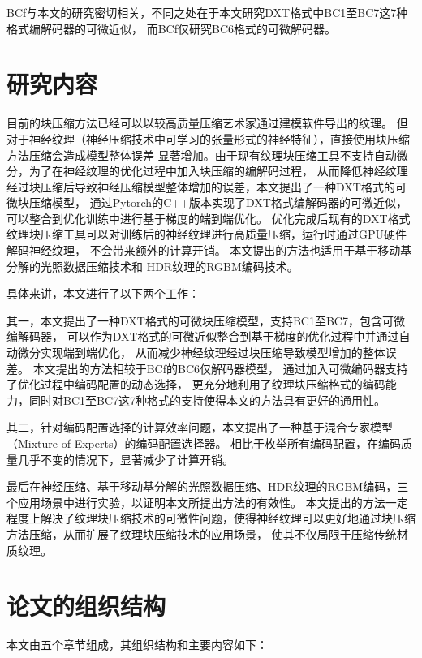 BCf\cite{weinreich2024real}与本文的研究密切相关，不同之处在于本文研究DXT格式中BC1至BC7这7种格式编解码器的可微近似，
而BCf\cite{weinreich2024real}仅研究BC6格式的可微解码器。

\section{研究内容}

目前的块压缩方法已经可以以较高质量压缩艺术家通过建模软件导出的纹理。
但对于神经纹理（神经压缩技术中可学习的张量形式的神经特征），直接使用块压缩方法压缩会造成模型整体误差
显著增加。由于现有纹理块压缩工具不支持自动微分，为了在神经纹理的优化过程中加入块压缩的编解码过程，
从而降低神经纹理经过块压缩后导致神经压缩模型整体增加的误差，本文提出了一种DXT格式的可微块压缩模型，
通过Pytorch的C++版本实现了DXT格式编解码器的可微近似，可以整合到优化训练中进行基于梯度的端到端优化。
优化完成后现有的DXT格式纹理块压缩工具可以对训练后的神经纹理进行高质量压缩，运行时通过GPU硬件解码神经纹理，
不会带来额外的计算开销。
本文提出的方法也适用于基于移动基分解的光照数据压缩技术\cite{silvennoinen2021moving}和
HDR纹理的RGBM编码技术。

具体来讲，本文进行了以下两个工作：

其一，本文提出了一种DXT格式的可微块压缩模型，支持BC1至BC7，包含可微编解码器，
可以作为DXT格式的可微近似整合到基于梯度的优化过程中并通过自动微分实现端到端优化，
从而减少神经纹理经过块压缩导致模型增加的整体误差。
本文提出的方法相较于BCf\cite{weinreich2024real}的BC6仅解码器模型，
通过加入可微编码器支持了优化过程中编码配置的动态选择，
更充分地利用了纹理块压缩格式的编码能力，同时对BC1至BC7这7种格式的支持使得本文的方法具有更好的通用性。

其二，针对编码配置选择的计算效率问题，本文提出了一种基于混合专家模型（Mixture of Experts）的编码配置选择器。
相比于枚举所有编码配置，在编码质量几乎不变的情况下，显著减少了计算开销。

最后在神经压缩\cite{weinreich2024real}、基于移动基分解的光照数据压缩\cite{silvennoinen2021moving}、HDR纹理的RGBM编码，三个应用场景中进行实验，以证明本文所提出方法的有效性。
本文提出的方法一定程度上解决了纹理块压缩技术的可微性问题，使得神经纹理可以更好地通过块压缩方法压缩，从而扩展了纹理块压缩技术的应用场景，
使其不仅局限于压缩传统材质纹理。

\section{论文的组织结构}

本文由五个章节组成，其组织结构和主要内容如下：

